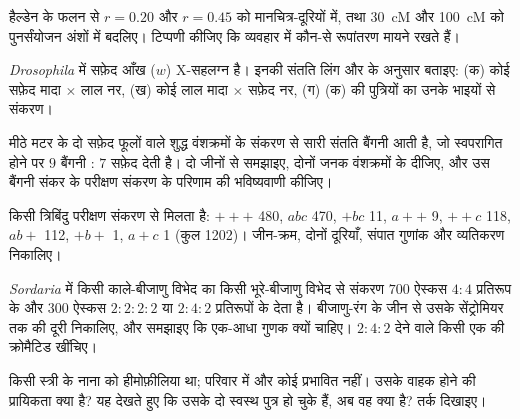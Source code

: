 \begin{exercise}[$\star\star$]\label{exo:b2:meiosis-heredity:7}
हैल्डेन के फलन से $r = 0.20$ और $r = 0.45$ को मानचित्र-दूरियों में,
तथा \qty{30}{cM} और \qty{100}{cM} को पुनर्संयोजन अंशों में बदलिए।
टिप्पणी कीजिए कि व्यवहार में कौन-से रूपांतरण मायने रखते हैं।
\end{exercise}

\begin{exercise}[$\star\star$]\label{exo:b2:meiosis-heredity:8}
\emph{Drosophila} में सफ़ेद आँख ($w$) X-सहलग्न  है। इनकी
संतति लिंग और  के अनुसार बताइए: (क) कोई सफ़ेद मादा $\times$
लाल नर, (ख) कोई लाल  मादा $\times$ सफ़ेद नर, (ग) (क) की
पुत्रियों का उनके भाइयों से संकरण।
\end{exercise}

\begin{exercise}[$\star\star$]\label{exo:b2:meiosis-heredity:9}
मीठे मटर के दो सफ़ेद फूलों वाले शुद्ध वंशक्रमों के संकरण से सारी संतति
बैंगनी आती है, जो स्वपरागित होने पर $9$ बैंगनी : $7$ सफ़ेद देती है।
दो जीनों से समझाइए, दोनों जनक वंशक्रमों के  दीजिए, और उस
बैंगनी संकर के परीक्षण संकरण के परिणाम की भविष्यवाणी कीजिए।
\end{exercise}

\begin{exercise}[$\star\star\star$]\label{exo:b2:meiosis-heredity:10}
किसी त्रिबिंदु परीक्षण संकरण से मिलता है: $+++$ 480, $abc$ 470, $+bc$ 11,
$a++$ 9, $++c$ 118, $ab+$ 112, $+b+$ 1, $a+c$ 1 (कुल 1202)। जीन-क्रम,
दोनों दूरियाँ, संपात गुणांक और व्यतिकरण निकालिए।
\end{exercise}

\begin{exercise}[$\star\star\star$]\label{exo:b2:meiosis-heredity:11}
\emph{Sordaria} में किसी काले-बीजाणु विभेद का किसी भूरे-बीजाणु विभेद से
संकरण $700$ ऐस्कस $4 : 4$ प्रतिरूप के और $300$ ऐस्कस
$2 : 2 : 2 : 2$ या $2 : 4 : 2$ प्रतिरूपों के देता है। बीजाणु-रंग
के जीन से उसके सेंट्रोमियर तक की दूरी निकालिए, और समझाइए कि एक-आधा गुणक
क्यों चाहिए। $2 : 4 : 2$ देने वाले किसी एक  की
क्रोमैटिड खींचिए।
\end{exercise}

\begin{exercise}[$\star\star\star$]\label{exo:b2:meiosis-heredity:12}
किसी स्त्री के नाना को हीमोफ़ीलिया था; परिवार में और कोई प्रभावित नहीं।
उसके वाहक होने की प्रायिकता क्या है? यह देखते हुए कि उसके दो स्वस्थ
पुत्र हो चुके हैं, अब वह क्या है? तर्क दिखाइए।
\end{exercise}

